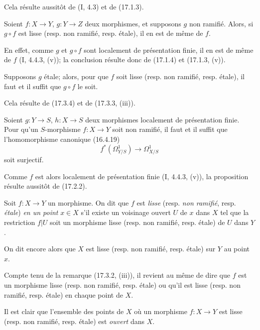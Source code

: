 Cela résulte aussitôt de (I, 4.3) et de (17.1.3).

\begin{proposition}[17.3.4]
\label{IV.17.3.4}
Soient $f:X\to Y$, $g:Y\to Z$ deux morphismes, et supposons $g$ non ramifié. Alors, si $g\circ f$ est lisse (resp. non ramifié, resp. étale), il en est de même de $f$.
\end{proposition}

En effet, comme $g$ et $g\circ f$ sont localement de présentation finie, il en est de même de $f$ (I, 4.4.3, (v)); la conclusion résulte donc de (17.1.4) et (17.1.3, (v)).

\begin{corollary}[17.3.5]
\label{IV.17.3.5}
Supposons $g$ étale; alors, pour que $f$ soit lisse (resp. non ramifié, resp. étale), il faut et il suffit que $g\circ f$ le soit.
\end{corollary}

Cela résulte de (17.3.4) et de (17.3.3, (iii)).

\begin{proposition}[17.3.6]
\label{IV.17.3.6}
Soient $g:Y\to S$, $h:X\to S$ deux morphismes localement de présentation finie. Pour qu'un $S$-morphisme $f:X\to Y$ soit non ramifié, il faut et il suffit que l'homomorphisme canonique (16.4.19)
\[
  f^*(\Omega_{Y/S}^1)\longrightarrow\Omega_{X/S}^1
\]
soit surjectif.
\end{proposition}

Comme $f$ est alors localement de présentation finie (I, 4.4.3, (v)), la proposition résulte aussitôt de (17.2.2).

\begin{definition}[17.3.7]
\label{IV.17.3.7}
Soit $f:X\to Y$ un morphisme. On dit que $f$ est \emph{lisse} (resp. \emph{non ramifié}, resp. \emph{étale}) \emph{en un point} $x\in X$ s'il existe un voisinage ouvert $U$ de $x$ dans $X$ tel que la restriction $f|U$ soit un morphisme lisse (resp. non ramifié, resp. étale) de $U$ dans $Y$.
\end{definition}

On dit encore alors que $X$ est lisse (resp. non ramifié, resp. étale) sur $Y$ au point $x$.

Compte tenu de la remarque (17.3.2, (iii)), il revient au même de dire que $f$ est un morphisme lisse (resp. non ramifié, resp. étale) ou qu'il est lisse (resp. non ramifié, resp. étale) en chaque point de $X$.

Il est clair que l'ensemble des points de $X$ où un morphisme $f:X\to Y$ est lisse (resp. non ramifié, resp. étale) est \emph{ouvert} dans $X$.

